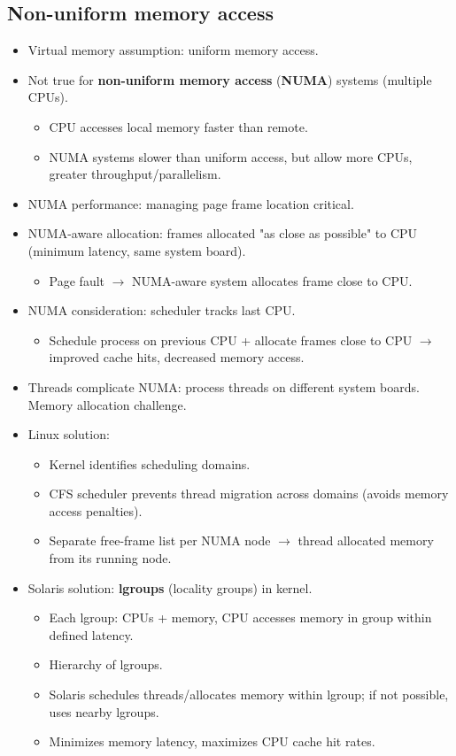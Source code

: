 \subsection{Non-uniform memory access}
\begin{itemize}
    \item Virtual memory assumption: uniform memory access.
    \item Not true for \textbf{non-uniform memory access} (\textbf{NUMA}) systems (multiple CPUs).
    \begin{itemize}
        \item CPU accesses local memory faster than remote.
        \item NUMA systems slower than uniform access, but allow more CPUs, greater throughput/parallelism.
    \end{itemize}
    \item NUMA performance: managing page frame location critical.
    \item NUMA-aware allocation: frames allocated "as close as possible" to CPU (minimum latency, same system board).
    \begin{itemize}
        \item Page fault $\rightarrow$ NUMA-aware system allocates frame close to CPU.
    \end{itemize}
    \item NUMA consideration: scheduler tracks last CPU.
    \begin{itemize}
        \item Schedule process on previous CPU + allocate frames close to CPU $\rightarrow$ improved cache hits, decreased memory access.
    \end{itemize}
    \item Threads complicate NUMA: process threads on different system boards. Memory allocation challenge.
    \item Linux solution:
    \begin{itemize}
        \item Kernel identifies scheduling domains.
        \item CFS scheduler prevents thread migration across domains (avoids memory access penalties).
        \item Separate free-frame list per NUMA node $\rightarrow$ thread allocated memory from its running node.
    \end{itemize}
    \item Solaris solution: \textbf{lgroups} (locality groups) in kernel.
    \begin{itemize}
        \item Each lgroup: CPUs + memory, CPU accesses memory in group within defined latency.
        \item Hierarchy of lgroups.
        \item Solaris schedules threads/allocates memory within lgroup; if not possible, uses nearby lgroups.
        \item Minimizes memory latency, maximizes CPU cache hit rates.
    \end{itemize}
\end{itemize}

